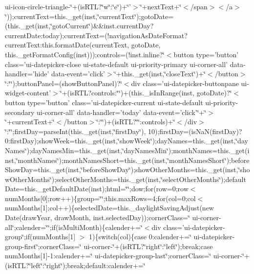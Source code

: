{{\begin{DoxyParamCaption}
ui-\/icon-\/circle-\/triangle-\/\char`\"{}+(is\+R\+T\+L?\char`\"{}w\char`\"{}\+:\char`\"{}e\char`\"{})+\char`\"{}'$>$\char`\"{}+next\+Text+\char`\"{}$<$/span$>$$<$/a$>$\char`\"{}));current\+Text=this.\+\_\+get(inst,\char`\"{}current\+Text\char`\"{});goto\+Date=(this.\+\_\+get(inst,\char`\"{}goto\+Current\char`\"{})\&\&inst.\+current\+Day?current\+Date\+:today);current\+Text=(!navigation\+As\+Date\+Format?current\+Text\+:this.\+format\+Date(current\+Text, goto\+Date, this.\+\_\+get\+Format\+Config(inst)));controls=(!inst.\+inline?\char`\"{}$<$button type='button' class='ui-\/datepicker-\/close ui-\/state-\/default ui-\/priority-\/primary ui-\/corner-\/all' data-\/handler='hide' data-\/event='click'$>$\char`\"{}+this.\+\_\+get(inst,\char`\"{}close\+Text\char`\"{})+\char`\"{}$<$/button$>$\char`\"{}\+:\char`\"{}\char`\"{});button\+Panel=(show\+Button\+Panel)?\char`\"{}$<$div class='ui-\/datepicker-\/buttonpane ui-\/widget-\/content'$>$\char`\"{}+(is\+R\+T\+L?controls\+:\char`\"{}\char`\"{})+(this.\+\_\+is\+In\+Range(inst, goto\+Date)?\char`\"{}$<$button type='button' class='ui-\/datepicker-\/current ui-\/state-\/default ui-\/priority-\/secondary ui-\/corner-\/all' data-\/handler='today' data-\/event='click'\char`\"{}+\char`\"{}$>$\char`\"{}+current\+Text+\char`\"{}$<$/button$>$\char`\"{}\+:\char`\"{}\char`\"{})+(is\+R\+T\+L?\char`\"{}\char`\"{}\+:controls)+\char`\"{}$<$/div$>$\char`\"{}\+:\char`\"{}\char`\"{};first\+Day=parse\+Int(this.\+\_\+get(inst,\char`\"{}first\+Day\char`\"{}), 10);first\+Day=(is\+Na\+N(first\+Day)?0\+:first\+Day);show\+Week=this.\+\_\+get(inst,\char`\"{}show\+Week\char`\"{});day\+Names=this.\+\_\+get(inst,\char`\"{}day\+Names\char`\"{});day\+Names\+Min=this.\+\_\+get(inst,\char`\"{}day\+Names\+Min\char`\"{});month\+Names=this.\+\_\+get(inst,\char`\"{}month\+Names\char`\"{});month\+Names\+Short=this.\+\_\+get(inst,\char`\"{}month\+Names\+Short\char`\"{});before\+Show\+Day=this.\+\_\+get(inst,\char`\"{}before\+Show\+Day\char`\"{});show\+Other\+Months=this.\+\_\+get(inst,\char`\"{}show\+Other\+Months\char`\"{});select\+Other\+Months=this.\+\_\+get(inst,\char`\"{}select\+Other\+Months\char`\"{});default\+Date=this.\+\_\+get\+Default\+Date(inst);html=\char`\"{}\char`\"{};dow;for(row=0;row$<$ num\+Months\mbox{[}0\mbox{]};row++)\{group=\char`\"{}\char`\"{};this.\+max\+Rows=4;for(col=0;col$<$ num\+Months\mbox{[}1\mbox{]};col++)\{selected\+Date=this.\+\_\+daylight\+Saving\+Adjust(new Date(draw\+Year, draw\+Month, inst.\+selected\+Day));corner\+Class=\char`\"{} ui-\/corner-\/all\char`\"{};calender=\char`\"{}\char`\"{};if(is\+Multi\+Month)\{calender+=\char`\"{}$<$div class='ui-\/datepicker-\/group\char`\"{};if(num\+Months\mbox{[}1\mbox{]} $>$ 1)\{switch(col)\{case 0\+:calender+=\char`\"{} ui-\/datepicker-\/group-\/first\char`\"{};corner\+Class=\char`\"{} ui-\/corner-\/\char`\"{}+(is\+R\+T\+L?\char`\"{}right\char`\"{}\+:\char`\"{}left\char`\"{});break;case num\+Months\mbox{[}1\mbox{]}-\/1\+:calender+=\char`\"{} ui-\/datepicker-\/group-\/last\char`\"{};corner\+Class=\char`\"{} ui-\/corner-\/\char`\"{}+(is\+R\+T\+L?\char`\"{}left\char`\"{}\+:\char`\"{}right\char`\"{});break;default\+:calender+=\char`\"{} 
\end{DoxyParamCaption}}}
